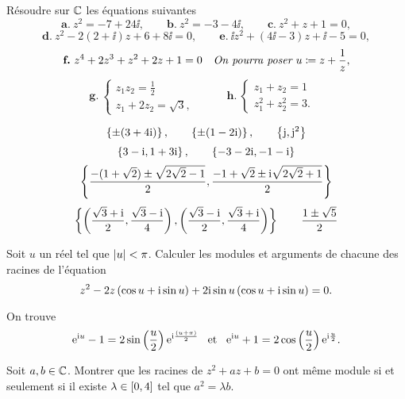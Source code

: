 \documentclass{magnolia}
\begin{document}
Résoudre sur $\mathbb{C}$ les équations suivantes
$$\textbf{a.}\ z^2=-7+24\ii, \qquad \textbf{b.}\ z^2=-3-4\ii, \qquad \textbf{c.}\ z^2+z+1=0,$$
$$\textbf{d.}\ z^2-2(2+\ii)z+6+8\ii=0, \qquad \textbf{e.}\ \ii z^2+(4\ii -3)z+\ii-5=0,$$
$$\textbf{f.}\ z^4+2z^3+z^2+2z+1=0 \quad \text{\it On pourra poser $u\coloneqq z+\frac{1}{z}$},$$
$$\textbf{g.}\ \begin{cases}
  z_1 z_2=\frac{1}{2} &\\
  z_1+2z_2 = \sqrt{3}, &
  \end{cases}
  \qquad\textbf{h.}\ 
  \begin{cases}
  z_1 + z_2=1 &\\
  z_1^2+z_2^2 = 3. &
  \end{cases}
$$
\begin{sol}
\[\left\{\pm(3+4{\rm i})\right\}, \qquad \left\{\pm(1-2{\rm i})\right\}, \qquad \left\{{\rm j},{\rm j}^2\right\}\]
\[\left\{3-{\rm i},1+3{\rm i}\right\}, \qquad \left\{-3-2{\rm i},-1-{\rm i}\right\}\]
\[\left\{\frac{-(1+\sqrt{2})\pm\sqrt{2\sqrt{2}-1}}{2},\frac{-1+\sqrt{2}\pm {\rm i} \sqrt{2\sqrt{2}+1}}{2}\right\}\]
\[\left\{\left(\frac{\sqrt{3}+{\rm i}}{2},\frac{\sqrt{3}-{\rm i}}{4}\right), \left(\frac{\sqrt{3}-{\rm i}}{2},\frac{\sqrt{3}+{\rm i}}{4}\right)\right\} \qquad
  \frac{1\pm\sqrt{5}}{2}\]
\end{sol}

Soit $u$ un réel tel que $\left|u\right|<\pi$. Calculer les modules et arguments de
chacune des racines de l'équation
\[z^2-2z\left(\cos u+{\rm i}\sin u\right)+2{\rm i}\sin u\left(\cos u+{\rm i}\sin u\right)=0.\]
\begin{sol}
On trouve
\[{\rm e}^{{\rm i} u}-1=2\sin\left(\frac{u}{2}\right){\rm e}^{{\rm i}\frac{(u+\pi)}{2}} \quad\!\text{et}\quad\!
  {\rm e}^{{\rm i} u}+1=2\cos\left(\frac{u}{2}\right){\rm e}^{{\rm i}\frac{u}{2}}.\]
\end{sol}

Soit $a,b\in\mathbb{C}$. Montrer que les racines de $z^2+az+b=0$ ont même module si et seulement
si il existe $\lambda\in\left[0,4\right]$ tel que $a^2=\lambda b$.
\end{document}
